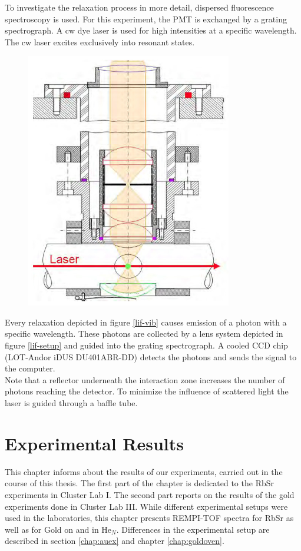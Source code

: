 \documentclass[parskip,12pt,headsepline,a4paper] {scrbook}
\begin{document}
To investigate the relaxation process in more detail, dispersed fluorescence spectroscopy is used. For this experiment, the PMT is exchanged by a grating spectrograph. A cw dye laser is used for high intensities at a specific wavelength. The cw laser excites exclusively into resonant states.
\begin{figure}[ht]
\centerline{
\includegraphics[width=9cm]{./measuring_methods/lif-setup.jpg}}
\end{figure}
Every relaxation depicted in figure \ref{lif-vib} causes emission of a photon with a specific wavelength. These photons are collected by a lens system depicted in figure \ref{lif-setup} and guided into the grating spectrograph. A cooled CCD chip (LOT-Andor iDUS DU401ABR-DD) detects the photons and sends the signal to the computer. \\
Note that a reflector underneath the interaction zone increases the number of photons reaching the detector. To minimize the influence of scattered light the laser is guided through a baffle tube.


\chapter{Experimental Results}
\label{chap:results}
\vspace{-1\baselineskip}
This chapter informs about the results of our experiments, carried out in the course of this thesis. The first part of the chapter is dedicated to the RbSr experiments in Cluster Lab I. The second part reports on the results of the gold experiments done in Cluster Lab III. While different experimental setups were used in the laboratories, this chapter presents REMPI-TOF spectra for RbSr as well as for Gold on and in He$_N$. Differences in the experimental setup are described in section \ref{chap:auex} and chapter \ref{chap:goldoven}.
\end{document}
